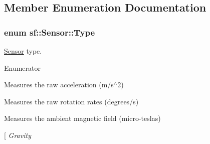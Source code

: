 \subsection{Member Enumeration Documentation}
\hypertarget{classsf_1_1_sensor_a687375af3ab77b818fca73735bcaea84}{
\subsubsection[{Type}]{\setlength{\rightskip}{0pt plus 5cm}enum {\bf sf\-::\-Sensor\-::\-Type}}}\label{classsf_1_1_sensor_a687375af3ab77b818fca73735bcaea84}


\hyperlink{classsf_1_1_sensor}{Sensor} type. 

\begin{Desc}
\item[Enumerator]\par
\begin{description}
\item[{\em 
\hypertarget{classsf_1_1_sensor_a687375af3ab77b818fca73735bcaea84a0f0a57d34c0d6a932c3088e7d6a16fde}{Accelerometer}\label{classsf_1_1_sensor_a687375af3ab77b818fca73735bcaea84a0f0a57d34c0d6a932c3088e7d6a16fde}
}]Measures the raw acceleration (m/s$^\wedge$2) \item[{\em 
\hypertarget{classsf_1_1_sensor_a687375af3ab77b818fca73735bcaea84a8a6a136ed089dd78dde8e9f7f3a86265}{Gyroscope}\label{classsf_1_1_sensor_a687375af3ab77b818fca73735bcaea84a8a6a136ed089dd78dde8e9f7f3a86265}
}]Measures the raw rotation rates (degrees/s) \item[{\em 
\hypertarget{classsf_1_1_sensor_a687375af3ab77b818fca73735bcaea84ae4386b358031ebd214c33475d55f93ab}{Magnetometer}\label{classsf_1_1_sensor_a687375af3ab77b818fca73735bcaea84ae4386b358031ebd214c33475d55f93ab}
}]Measures the ambient magnetic field (micro-\/teslas) \item[{\em 
\hypertarget{classsf_1_1_sensor_a687375af3ab77b818fca73735bcaea84a88fc8025c897135e18ea02cfe26c7361}{Gravity}\label{classsf_1_1_sensor_a687375af3ab77b818fca73735bcaea84a88fc8025c897135e18ea02cfe26c7361}
}
\end{description}
\end{Desc}
